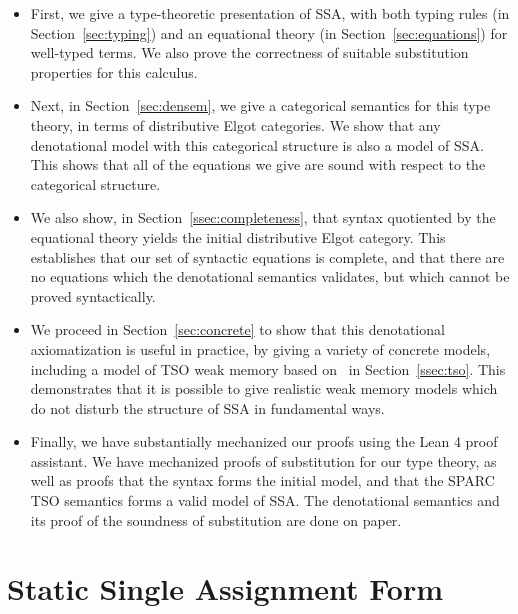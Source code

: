 \documentclass[acmsmall,screen,review]{acmart}
\begin{document}
\begin{itemize}
\item First, we give a type-theoretic presentation of SSA, with both typing rules (in
  Section~\ref{sec:typing}) and an equational theory (in Section~\ref{sec:equations}) for
  well-typed terms. We also prove the correctness of suitable substitution properties for this
  calculus. 
  
\item Next, in Section~\ref{sec:densem}, we give a categorical semantics for this type theory, in
  terms of distributive Elgot categories. We show that any denotational model with this categorical
  structure is also a model of SSA. This shows that all of the equations we give are sound with
  respect to the categorical structure. 

\item We also show, in Section~\ref{ssec:completeness}, that syntax quotiented by the equational
  theory yields the initial distributive Elgot category. This establishes that our set of syntactic
  equations is complete, and that there are no equations which the denotational semantics validates,
  but which cannot be proved syntactically. 

\item We proceed in Section~\ref{sec:concrete} to show that this denotational axiomatization is
  useful in practice, by giving a variety of concrete models, including a model of TSO weak memory
  based on~\citet{sparky} in Section~\ref{ssec:tso}. This demonstrates that it is possible to give
  realistic weak memory models which do not disturb the structure of SSA in fundamental ways.

\item Finally, we have substantially mechanized our proofs using the Lean 4 proof assistant. We have
  mechanized proofs of substitution for our type theory, as well as proofs that the syntax forms the
  initial model, and that the SPARC TSO semantics forms a valid model of SSA. The denotational
  semantics and its proof of the soundness of substitution are done on paper. 

\end{itemize}

\section{Static Single Assignment Form}
\end{document}
